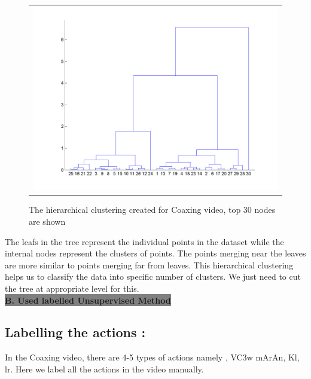 \def\DevnagVersion{2.15}\documentclass[a4paper, 10pt, notitlepage]{report}
\begin{document}
\begin{figure}[h]
\center
\begin{tabular}{c}
\includegraphics[scale=0.30]{dendoCoax.png}
\end{tabular}
\label{tab:gt}
\caption{The hierarchical clustering created for Coaxing video, top 30 nodes are shown}
\end{figure} 
 
 The leafs in the tree represent the individual points in the dataset while the internal nodes represent the clusters of points. The points merging near the leaves are more similar to points merging far from leaves. This hierarchical clustering helps us to classify the data into specific number of clusters. We just need to cut the tree at appropriate level for this.\\
 
 \colorbox{gray}{\Large \bf B. Used labelled Unsupervised Method}

\subsection{Labelling the actions :}
In the Coaxing video, there are 4-5 types of actions namely {\dn {} {\rs ,\re} V\3C3w mArAn{\rs ,\re} K\?l{\rs ,\re} lr}. Here we label all the actions in the video manually. 
 
 
 
 
 
\end{document}
